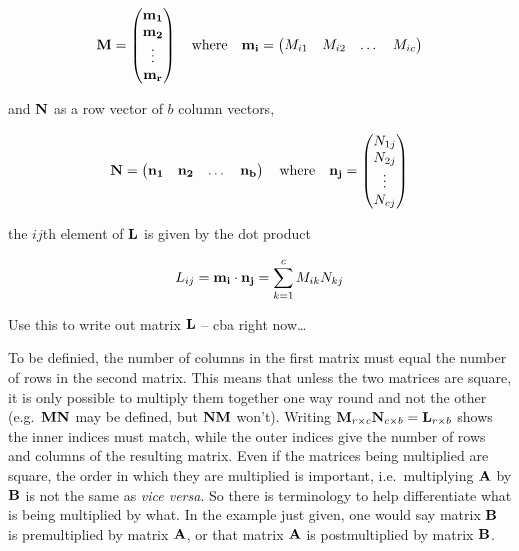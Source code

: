 \documentclass[
]{book}
\begin{document}
\begin{equation}
    \mx{M} = 
    \begin{pmatrix}
        \mx{m_1} \\
        \mx{m_2} \\
        \vdots \\
        \mx{m_r}
    \end{pmatrix} 
    \ \ \ \mathrm{where}\ \ \ 
    \mx{m_i} = 
    \begin{pmatrix}
        M_{i1} & M_{i2} & \dots & M_{ic}
    \end{pmatrix}
    \notag
\end{equation}

and \(\mathbf{N}\) as a row vector of \(b\) column vectors,

\begin{equation}
    \mx{N} = 
    \begin{pmatrix}
        \mx{n_1} & \mx{n_2} & \dots & \mx{n_b}
    \end{pmatrix}
    \ \ \ \mathrm{where}\ \ \ 
    \mx{n_j} = 
    \begin{pmatrix}
        N_{1j} \\
        N_{2j} \\
        \vdots \\
        N_{cj} \\
    \end{pmatrix} 
    \notag
\end{equation}

the \(ij\)th element of \(\mathbf{L}\) is given by the dot product

\begin{equation}
    L_{ij} = \mathbf{m_i} \cdot \mathbf{n_j} = \sum^c_{k=1} {M_{ik}N_{kj}}
    \label{eq:matrix-multiplication-L}
\end{equation}

Use this to write out matrix \(\mathbf{L}\) -- cba right now\ldots{}

To be definied, the number of columns in the first matrix must equal the number of rows in the second matrix. This means that unless the two matrices are square, it is only possible to multiply them together one way round and not the other (e.g.~\(\mathbf{M}\mathbf{N}\) may be defined, but \(\mathbf{N}\mathbf{M}\) won't). Writing \(\mathbf{M}_{r \times c}\mathbf{N}_{c \times b} = \mathbf{L}_{r \times b}\) shows the inner indices must match, while the outer indices give the number of rows and columns of the resulting matrix. Even if the matrices being multiplied are square, the order in which they are multiplied is important, i.e.~multiplying \(\mathbf{A}\) by \(\mathbf{B}\) is not the same as \emph{vice versa}. So there is terminology to help differentiate what is being multiplied by what. In the example just given, one would say matrix \(\mathbf{B}\) is premultiplied by matrix \(\mathbf{A}\), or that matrix \(\mathbf{A}\) is postmultiplied by matrix \(\mathbf{B}\).
\end{document}
